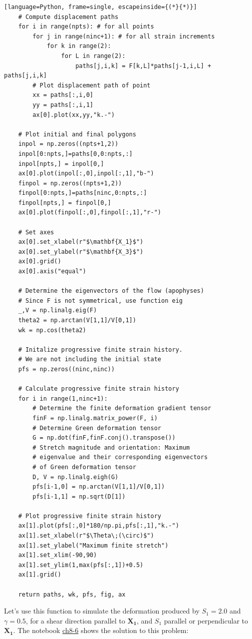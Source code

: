 \documentclass[a4paper , 12pt]{book}
\begin{document}
\begin{center}
\begin{lstlisting}[language=Python, frame=single, escapeinside={(*}{*)}]
	# Compute displacement paths
	for i in range(npts): # for all points
		for j in range(ninc+1): # for all strain increments
			for k in range(2):
				for L in range(2):
					paths[j,i,k] = F[k,L]*paths[j-1,i,L] + paths[j,i,k]
		# Plot displacement path of point
		xx = paths[:,i,0]
		yy = paths[:,i,1]
		ax[0].plot(xx,yy,"k.-")
	
	# Plot initial and final polygons
	inpol = np.zeros((npts+1,2))
	inpol[0:npts,]=paths[0,0:npts,:]
	inpol[npts,] = inpol[0,]
	ax[0].plot(inpol[:,0],inpol[:,1],"b-")
	finpol = np.zeros((npts+1,2))
	finpol[0:npts,]=paths[ninc,0:npts,:]
	finpol[npts,] = finpol[0,]
	ax[0].plot(finpol[:,0],finpol[:,1],"r-")
	
	# Set axes
	ax[0].set_xlabel(r"$\mathbf{X_1}$")
	ax[0].set_ylabel(r"$\mathbf{X_3}$")
	ax[0].grid()
	ax[0].axis("equal")
	
	# Determine the eigenvectors of the flow (apophyses)
	# Since F is not symmetrical, use function eig
	_,V = np.linalg.eig(F)
	theta2 = np.arctan(V[1,1]/V[0,1])
	wk = np.cos(theta2)
	
	# Initalize progressive finite strain history. 
	# We are not including the initial state
	pfs = np.zeros((ninc,ninc))
	
	# Calculate progressive finite strain history
	for i in range(1,ninc+1):
		# Determine the finite deformation gradient tensor
		finF = np.linalg.matrix_power(F, i)
		# Determine Green deformation tensor
		G = np.dot(finF,finF.conj().transpose())
		# Stretch magnitude and orientation: Maximum 
		# eigenvalue and their corresponding eigenvectors
		# of Green deformation tensor
		D, V = np.linalg.eigh(G)
		pfs[i-1,0] = np.arctan(V[1,1]/V[0,1])
		pfs[i-1,1] = np.sqrt(D[1])
	
	# Plot progressive finite strain history
	ax[1].plot(pfs[:,0]*180/np.pi,pfs[:,1],"k.-")
	ax[1].set_xlabel(r"$\Theta\;(\circ)$")
	ax[1].set_ylabel("Maximum finite stretch")
	ax[1].set_xlim(-90,90)
	ax[1].set_ylim(1,max(pfs[:,1])+0.5)
	ax[1].grid()
	
	return paths, wk, pfs, fig, ax
\end{lstlisting}
\end{center}

Let's use this function to simulate the deformation produced by $S_1 = 2.0$ and $\gamma = 0.5$, for a shear direction parallel to $\mathbf{X_1}$, and $S_1$ parallel or perpendicular to $\mathbf{X_1}$. The notebook \href{https://github.com/nfcd/compGeo/blob/master/source/notebooks/ch8-6.ipynb}{ch8-6} shows the solution to this problem:
\end{document}
